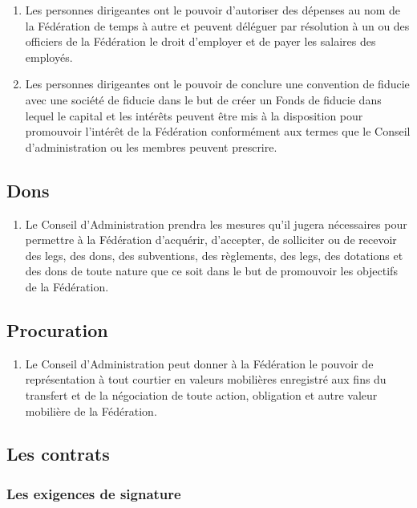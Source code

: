 \begin{enumerate}
 \item
  Les personnes dirigeantes ont le pouvoir d'autoriser des dépenses au nom de la Fédération de temps à autre et peuvent déléguer par résolution à un ou des officiers de la Fédération le droit d'employer et de payer les salaires des employés.
 \item
  Les personnes dirigeantes ont le pouvoir de conclure une convention de fiducie avec une société de fiducie dans le but de créer un Fonds de fiducie dans lequel le capital et les intérêts peuvent être mis à la disposition pour promouvoir l'intérêt de la Fédération conformément aux termes que le Conseil d'administration ou les membres peuvent prescrire.
\end{enumerate}

\subsection{Dons}
\label{dons}

\begin{enumerate}
 \item
  Le Conseil d'Administration prendra les mesures qu'il jugera nécessaires pour permettre à la Fédération d'acquérir, d'accepter, de solliciter ou de recevoir des legs, des dons, des subventions, des règlements, des legs, des dotations et des dons de toute nature que ce soit dans le but de promouvoir les objectifs de la Fédération.
\end{enumerate}

\subsection{Procuration}
\label{procuration}

\begin{enumerate}
 \item
  Le Conseil d'Administration peut donner à la Fédération le pouvoir de représentation à tout courtier en valeurs mobilières enregistré aux fins du transfert et de la négociation de toute action, obligation et autre valeur mobilière de la Fédération.
\end{enumerate}

\subsection{Les contrats}
\label{les-contrats}

\subsubsection{Les exigences de signature}
\label{les-exigences-de-signature}

